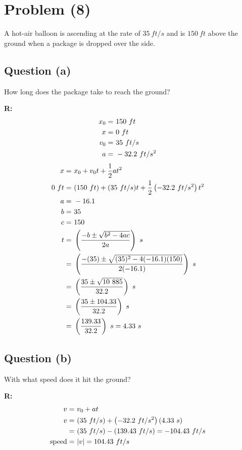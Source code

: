 \section{Problem (8)}
	A hot-air balloon is ascending at the rate of $35 \ ft/s$ and is $150 \ ft$ above the ground when a package is dropped over the side.

	\subsection{Question (a)}
		How long does the package take to reach the ground?

		\textbf{R:} \newline
		\begin{align}
			x_{0} = \ &150 \ ft& \notag \\
			x = \ &0 \ ft& \notag \\
			v_{0} = \ &35 \ ft/s& \notag \\
			a = \ &- 32.2 \ ft/s^{2}& \notag
		\end{align}
		\begin{align}
			x = \ &x_{0} + v_{0}t + \frac{1}{2}at^{2}& \notag \\
			0 \ ft = \ &(150 \ ft) + (35 \ ft/s)t + \frac{1}{2}\left( - 32.2 \ ft/s^{2} \right)t^{2}& \notag \\
			a = \ &-16.1& \notag \\
			b = \ &35& \notag \\
			c = \ &150& \notag \\
			t = \ &\left( \frac{-b \pm \sqrt{b^{2} - 4ac}}{2a} \right) \ s& \notag \\
			= \ &\left( \frac{- (35) \pm \sqrt{(35)^{2} - 4(-16.1)(150)}}{2(-16.1)} \right) \ s& \notag \\
			= \ &\left( \frac{35 \pm \sqrt{10 \ 885}}{32.2} \right) \ s& \notag \\
			= \ &\left( \frac{35 \pm 104.33}{32.2} \right) \ s& \notag \\
			= \ &\left( \frac{139.33}{32.2} \right) \ s = 4.33 \ s&
		\end{align}

	\subsection{Question (b)}
		With what speed does it hit the ground?

		\textbf{R:} \newline
		\begin{align}
			v = \ &v_{0} + at& \notag \\
			v = \ &(35 \ ft/s) + \left( -32.2 \ ft/s^{2} \right)(4.33 \ s)& \notag \\
			= \ &(35 \ ft/s) - (139.43 \ ft/s) = - 104.43 \ ft/s& \notag \\
			\text{speed} = \ &|v| = 104.43 \ ft/s&
		\end{align}
